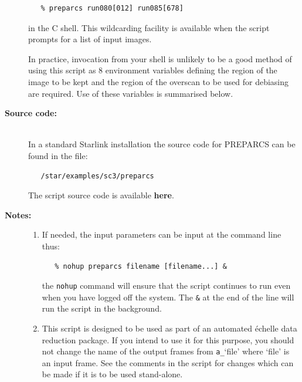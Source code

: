 \documentclass[twoside,11pt]{article}
\newenvironment{latexonly}{}{}
\newcommand{\htmlref}[2]{#1}
\begin{document}
\begin{description}
\begin{verbatim}
   % preparcs run080[012] run085[678]
\end{verbatim}

     in the C shell.  This wildcarding facility is available when the
     script prompts for a list of input images.

     In practice, invocation from your shell is unlikely to be a good
     method of using this script as 8 environment variables defining
     the region of the image to be kept and the region of the overscan
     to be used for debiasing are required.  Use of these variables is
     summarised below.

\item [{\bf Source code:}] \mbox{} \\
\begin{latexonly}
In a standard Starlink installation the source code for PREPARCS can be found
in the file:
\begin{verbatim}
   /star/examples/sc3/preparcs
\end{verbatim}
\end{latexonly}
\begin{htmlonly}
      The script source code is available
      \htmlref{{\bf here}}{se_preparcs_source}.
\end{htmlonly}

\item [{\bf Notes:}] \mbox{}
\begin{enumerate}

\item If needed, the input parameters can be input at the command
      line thus:

\begin{verbatim}
   % nohup preparcs filename [filename...] &
\end{verbatim}

      the \verb+nohup+ command will ensure that the script continues
      to run even when you have logged off the system.  The \verb+&+ at
      the end of the line will run the script in the background.

\item This script is designed to be used as part of an automated
      \'{e}chelle data reduction package.  If you intend to use it
      for this purpose, you should not change the name of the output
      frames from \verb+a_+`file' where `file' is an input frame.  See the
      comments in the script for changes which can be made if it is
      to be used stand-alone.


\end{enumerate}
\end{description}
\end{document}

